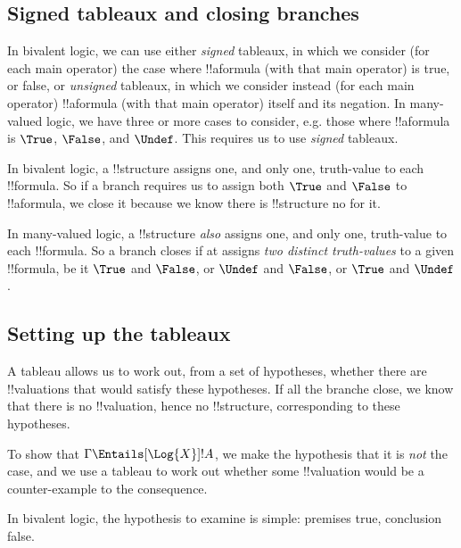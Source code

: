 \documentclass[../../../include/open-logic-section]{subfiles}
\begin{document}


\subsection{Signed tableaux and closing branches}

In bivalent logic, we can use either \emph{signed} tableaux, 
in which we consider (for each main operator) the case where !!a{formula}
(with that main operator) is true, or false, or \emph{unsigned} tableaux,
in which we consider instead (for each main operator) !!a{formula}
(with that main operator) itself and its negation. In many-valued logic,
we have three or more cases to consider, e.g. those where !!a{formula}
is $\True$, $\False$, and $\Undef$. This requires us to use \emph{signed}
tableaux.

In bivalent logic, a !!{structure} assigns one, and only one, truth-value
to each !!{formula}. So if a branch requires us to assign both $\True$ and 
$\False$ to !!a{formula}, we close it because we know there is !!{structure} 
no for it.

In many-valued logic, a !!{structure} \emph{also} assigns one,
 and only one, truth-value to each !!{formula}. So a branch
 closes if at assigns \emph{two distinct truth-values} to a given
 !!{formula}, be it $\True$ and $\False$, or $\Undef$ and $\False$,
 or $\True$ and $\Undef$.

\subsection{Setting up the tableaux}

A tableau allows us to work out, from a set of hypotheses, whether 
there are !!{valuation}s that would satisfy these hypotheses. If all
the branche close, we know that there is no !!{valuation}, hence no
!!{structure}, corresponding to these hypotheses.

To show that $\Gamma \Entails[\Log{X}] !A$, we make the hypothesis that
it is \emph{not} the case, and we use a tableau to work out whether some 
!!{valuation} would be a counter-example to the consequence. 

In bivalent logic, the hypothesis to examine is simple: premises true, 
conclusion false. 
\end{document}
